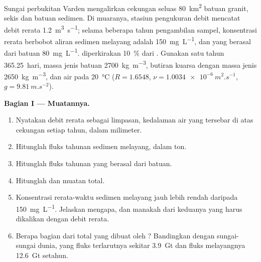 \begin{problem}
\label{pb:b1:erosion-transport:1}
Sungai perbukitan Varden mengalirkan cekungan seluas \qty{80}{km^2} batuan granit,
sekis dan batuan sedimen. Di muaranya, stasiun pengukuran debit mencatat debit rerata \qty{1.2}{m^3.s^{-1}}; selama beberapa tahun pengambilan sampel, konsentrasi rerata berbobot aliran sedimen melayang adalah \qty{150}{mg.L^{-1}}, dan  yang berasal dari batuan \qty{80}{mg.L^{-1}}.
 diperkirakan \qty{10}{\percent} dari . Gunakan satu tahun \num{365.25}~hari, massa jenis batuan \qty{2700}{kg.m^{-3}}, butiran kuarsa dengan massa jenis \qty{2650}{kg.m^{-3}}, dan air pada \qty{20}{\celsius} ($R
= 1.6548$, $\nu = \qty{1.0034e-6}{m^2.s^{-1}}$, $g = \qty{9.81}{m.s^{-2}}$).

\medskip
\noindent\textbf{Bagian I --- Muatannya.}
\begin{enumerate}
  \item Nyatakan debit rerata sebagai limpasan, kedalaman air yang tersebar
        di atas cekungan setiap tahun, dalam milimeter.
  \item Hitunglah fluks tahunan sedimen melayang, dalam ton.
  \item Hitunglah fluks tahunan  yang berasal dari batuan.
  \item Hitunglah  dan muatan total.
  \item Konsentrasi rerata-waktu sedimen melayang jauh lebih rendah daripada \qty{150}{mg.L^{-1}}. Jelaskan mengapa, dan manakah dari keduanya yang harus dikalikan dengan debit rerata.
  \item Berapa bagian dari total yang dibuat oleh ? Bandingkan dengan sungai-sungai dunia, yang fluks terlarutnya sekitar
        \qty{3.9}{Gt} dan fluks melayangnya \qty{12.6}{Gt} setahun.
\end{enumerate}


\end{problem}
